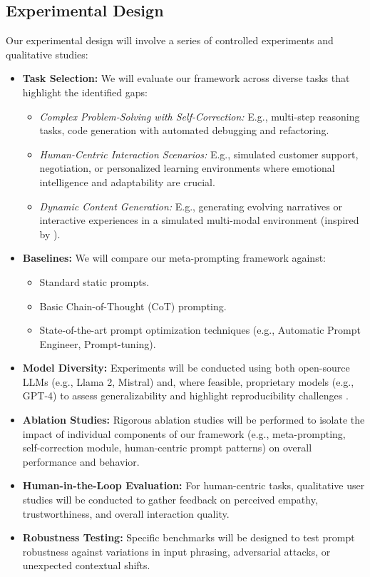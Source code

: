 \documentclass{article}
\begin{document}
\subsection{Experimental Design}
Our experimental design will involve a series of controlled experiments and qualitative studies:
\begin{itemize}
    \item \textbf{Task Selection:} We will evaluate our framework across diverse tasks that highlight the identified gaps:
    \begin{itemize}
        \item \textit{Complex Problem-Solving with Self-Correction:} E.g., multi-step reasoning tasks, code generation with automated debugging and refactoring.
        \item \textit{Human-Centric Interaction Scenarios:} E.g., simulated customer support, negotiation, or personalized learning environments where emotional intelligence and adaptability are crucial.
        \item \textit{Dynamic Content Generation:} E.g., generating evolving narratives or interactive experiences in a simulated multi-modal environment (inspired by \cite{PaperFour}).
    \end{itemize}
    \item \textbf{Baselines:} We will compare our meta-prompting framework against:
    \begin{itemize}
        \item Standard static prompts.
        \item Basic Chain-of-Thought (CoT) prompting.
        \item State-of-the-art prompt optimization techniques (e.g., Automatic Prompt Engineer, Prompt-tuning).
    \end{itemize}
    \item \textbf{Model Diversity:} Experiments will be conducted using both open-source LLMs (e.g., Llama 2, Mistral) and, where feasible, proprietary models (e.g., GPT-4) to assess generalizability and highlight reproducibility challenges \cite{PaperFive}.
    \item \textbf{Ablation Studies:} Rigorous ablation studies will be performed to isolate the impact of individual components of our framework (e.g., meta-prompting, self-correction module, human-centric prompt patterns) on overall performance and behavior.
    \item \textbf{Human-in-the-Loop Evaluation:} For human-centric tasks, qualitative user studies will be conducted to gather feedback on perceived empathy, trustworthiness, and overall interaction quality.
    \item \textbf{Robustness Testing:} Specific benchmarks will be designed to test prompt robustness against variations in input phrasing, adversarial attacks, or unexpected contextual shifts.
\end{itemize}
\end{document}
